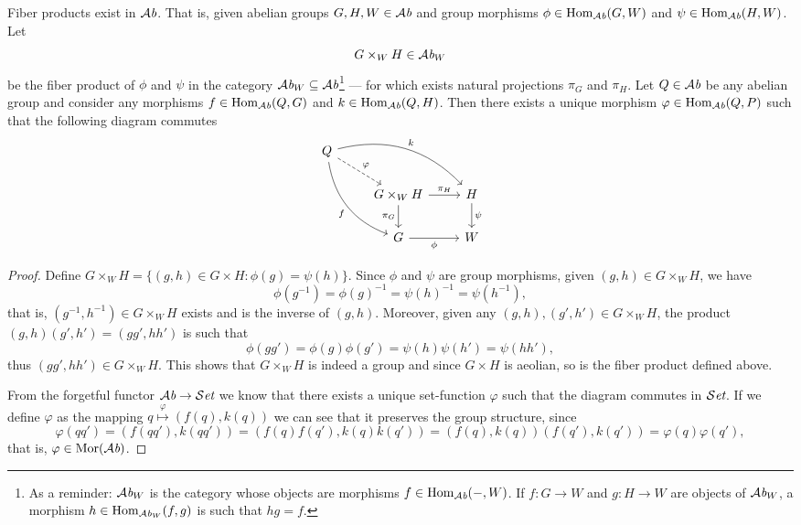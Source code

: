 \begin{proposition}
  Fiber products exist in \({\mathcal{A}\textit{b}}\). That is, given abelian groups \(G, H, W \in
  {\mathcal{A}\textit{b}}\) and group morphisms \(\phi \in \operatorname{Hom}_{\mathcal{A}\textit{b}}(G, W)\) and \(\psi \in
  \operatorname{Hom}_{\mathcal{A}\textit{b}}(H, W)\). Let
  \[
    G \times_W H \in {\mathcal{A}\textit{b}}_W
  \]
  be the fiber product of \(\phi\) and \(\psi\) in the category \({\mathcal{A}\textit{b}}_W
  \subseteq {\mathcal{A}\textit{b}}\)\footnote{As a reminder: \({\mathcal{A}\textit{b}}_W\) is the category whose
  objects are morphisms \(f \in \operatorname{Hom}_{\mathcal{A}\textit{b}}(-, W)\). If \(f: G \to W\) and \(g: H
  \to W\) are objects of \({\mathcal{A}\textit{b}}_W\), a morphism \(h \in \operatorname{Hom}_{{\mathcal{A}\textit{b}}_W}(f, g)\) is
  such that \(hg = f\).}
  --- for which exists natural projections \(\pi_G\) and \(\pi_H\). Let \(Q \in
  {\mathcal{A}\textit{b}}\) be any abelian group and consider any morphisms \(f \in \operatorname{Hom}_{\mathcal{A}\textit{b}}(Q, G)\)
  and \(k \in \operatorname{Hom}_{\mathcal{A}\textit{b}}(Q, H)\). Then there exists a unique morphism \(\varphi
  \in \operatorname{Hom}_{\mathcal{A}\textit{b}}(Q, P)\) such that the following diagram commutes
  \[
    \begin{tikzcd}
      Q \ar[dr, dashed, "\varphi"] \ar[ddr, bend right, swap, "f"]
      \ar[drr, bend left, "k"]
      & & \\
      &G \times_W H \ar[r, "\pi_H"] \ar[d, swap, "\pi_G"] &H \ar[d, "\psi"] \\
      &G \ar[r, swap, "\phi"] &W
    \end{tikzcd}
  \]
\end{proposition}

\begin{proof}
  Define \(G \times_W H = \{(g, h) \in G \times H : \phi(g) = \psi(h)\}\). Since
  \(\phi\) and \(\psi\) are group morphisms, given \((g, h) \in G \times_W H\),
  we have
  \[
    \phi(g^{-1}) = \phi(g)^{-1} = \psi(h)^{-1} = \psi(h^{-1}),
  \]
  that is, \((g^{-1}, h^{-1}) \in G \times_W H\) exists and is the inverse of
  \((g, h)\). Moreover, given any \((g, h), (g', h') \in G \times_W H\), the
  product \((g, h)(g', h') = (gg', hh')\) is such that
  \[
    \phi(gg') = \phi(g) \phi(g') = \psi(h) \psi(h') = \psi(hh'),
  \]
  thus \((gg', hh') \in G \times_W H\). This shows that \(G \times_W H\) is
  indeed a group and since \(G \times H\) is aeolian, so is the fiber product
  defined above.

  From the forgetful functor \({\mathcal{A}\textit{b}} \to {\mathcal{S}\textit{et}}\) we know that there exists a unique
  set-function \(\varphi\) such that the diagram commutes in \({\mathcal{S}\textit{et}}\). If we
  define \(\varphi\) as the mapping \(q \overset \varphi \longmapsto (f(q),
  k(q))\) we can see that it preserves the group structure, since
  \[
    \varphi(qq') = (f(qq'), k(qq')) = (f(q)f(q'), k(q)k(q'))
    = (f(q), k(q))(f(q'), k(q')) = \varphi(q) \varphi(q'),
  \]
  that is, \(\varphi \in \operatorname{Mor}({\mathcal{A}\textit{b}})\).
\end{proof}
